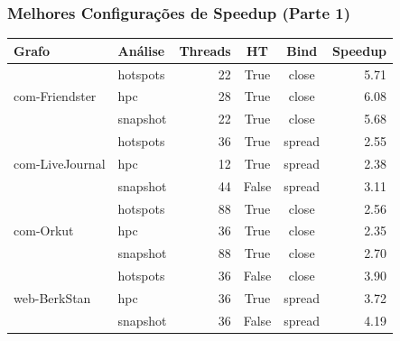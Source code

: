 \documentclass{beamer}
\begin{document}
\begin{frame}[fragile]
    \frametitle{Melhores Configurações de Speedup (Parte 1)}
    
    \begin{center}
    \scriptsize 
    \setlength{\tabcolsep}{4pt} 
    
    \begin{tabular}{@{}llrccr@{}}
        \toprule
        \textbf{Grafo} & \textbf{Análise} & \textbf{Threads} & \textbf{HT} & \textbf{Bind} & \textbf{Speedup} \\
        \midrule
        \multirow{3}{*}{com-Friendster} & hotspots & 22 & True & close & 5.71 \\
         & hpc & 28 & True & close & 6.08 \\
         & snapshot & 22 & True & close & 5.68 \\
        \midrule
        \multirow{3}{*}{com-LiveJournal} & hotspots & 36 & True & spread & 2.55 \\
         & hpc & 12 & True & spread & 2.38 \\
         & snapshot & 44 & False & spread & 3.11 \\
        \midrule
        \multirow{3}{*}{com-Orkut} & hotspots & 88 & True & close & 2.56 \\
         & hpc & 36 & True & close & 2.35 \\
         & snapshot & 88 & True & close & 2.70 \\
        \midrule
        \multirow{3}{*}{web-BerkStan} & hotspots & 36 & False & close & 3.90 \\
         & hpc & 36 & True & spread & 3.72 \\
         & snapshot & 36 & False & spread & 4.19 \\
        \bottomrule
    \end{tabular}
    \end{center} 
\end{frame}
\end{document}
